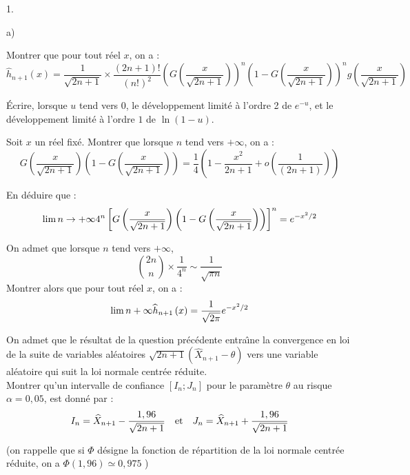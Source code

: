 \documentclass[11pt]{article}%
\begin{document}
\begin{noliste}{1.}
\begin{noliste}{a)}
 \setlength{\itemsep}{2mm}
\item Montrer que pour tout réel $x$, on a :
\[
\widehat{h}_{n + 1}\left( x\right) = \frac{1}{\sqrt{2n + 1}}\times
\frac{\left(
2n + 1\right) !}{\left( n!\right) ^{2}}\left( G\left( \frac{x}{\sqrt{2n
+ 1}}\right) \right) ^{n}\left( 1-G\left( \frac{x}{\sqrt{2n +
1}}\right) \right)
^{n}g\left( \frac{x}{\sqrt{2n + 1}}\right)
\]

\item Écrire, lorsque $u$ tend vers 0, le développement limité 
à l'ordre 2 de $e^{-u}$, et le développement limité à
l'ordre $1$ de $\ln \left( 1-u\right) $.

\item Soit $x$ un réel fixé. Montrer que lorsque $n$ tend vers $ +
\infty $, on a :
\[
G\left( \frac{x}{\sqrt{2n + 1}}\right) \left( 1-G\left(
\frac{x}{\sqrt{2n + 1}}\right) \right) = \frac{1}{4}\left(
1-\frac{x^{2}}{2n + 1} + o\left( \frac{1}{\left( 2n + 1\right) }\right)
\right)
\]

\item En déduire que : 
\[
\lim{n\rightarrow + \infty }4^{n}\left[ G\left( \frac{x}{\sqrt{2n +
1}}\right)
\left( 1-G\left( \frac{x}{\sqrt{2n + 1}}\right) \right) \right]
^{n} = e^{-x^{2}/2}
\]

\item On admet que lorsque $n$ tend vers $ + \infty $, 
\[
\binom{2n}{n}\times \frac{1}{4^{n}}\sim \frac{1}{\sqrt{\pi n}}
\]
Montrer alors que pour tout réel $x$, on a :
\[
\lim{n + \infty }\widehat{h}_{n + 1}\left( x\right) =
\frac{1}{\sqrt{2\pi }}e^{-x^{2}/2}
\]
\end{noliste}

\item On admet que le résultat de la question précédente entra\^{\i}ne
la convergence en loi de la suite de variables aléatoires $\sqrt{2n +
1}\left( \widehat{X}_{n + 1}-\theta \right) $ vers une variable
aléatoire qui suit la loi normale centrée réduite.\\
Montrer qu'un intervalle de confiance $\left[ I_{n};J_{n}\right] $ pour
le
paramètre $\theta $ au risque $\alpha = 0,05$, est donné par :
\[
I_{n} = \widehat{X}_{n + 1}-\frac{1,96}{\sqrt{2n + 1}}\text{\quad
et\quad }J_{n} = \widehat{X}_{n + 1} + \frac{1,96}{\sqrt{2n + 1}}
\]
\end{noliste}

(on rappelle que si $\Phi $ désigne la fonction de répartition de la
loi normale centrée réduite, on a $\Phi \left( 1,96\right) \simeq
0,975$ )
\end{document}
